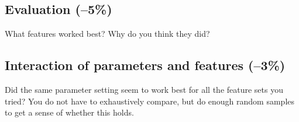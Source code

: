 \documentclass[12pt]{article}
\begin{document}
\subsection{Evaluation \rm(--5\%)}
What features worked best? Why do you think they did?

\subsection{Interaction of parameters and features \rm(--3\%)}
Did the same parameter setting seem to work best for all the feature sets you tried? You do not have to exhaustively compare, but do enough random samples to get a sense of whether this holds.
\end{document}
